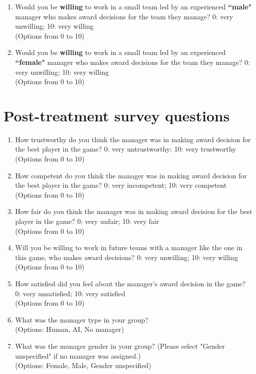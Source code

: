 \begin{enumerate}
    \item Would you be \textbf{willing} to work in a small team led by an experienced \textbf{``male"} manager who makes award decisions for the team they manage? 0: very unwilling; 10: very willing
   \\ (Options from 0 to 10)
    
    \item Would you be \textbf{willing} to work in a small team led by an experienced \textbf{``female"} manager who makes award decisions for the team they manage? 0: very unwilling; 10: very willing
   \\ (Options from 0 to 10)
   
\end{enumerate}

\section*{Post-treatment survey questions}

\begin{enumerate}

\item How trustworthy do you think the manager was in making award decision for the best player in the game? 0: very untrustworthy; 10: very trustworthy
\\ (Options from 0 to 10)

\item How competent do you think the manager was in making award decision for the best player in the game? 0: very incompetent; 10: very competent
\\ (Options from 0 to 10)

\item How fair do you think the manager was in making award decision for the best player in the game? 0: very unfair; 10: very fair
\\ (Options from 0 to 10)

\item Will you be willing to work in future teams with a manager like the one in this game, who makes award decisions? 0: very unwilling; 10: very willing
\\ (Options from 0 to 10)

\item How satisfied did you feel about the manager’s award decision in the game? 0: very unsatisfied; 10: very satisfied
\\ (Options from 0 to 10)

\item What was the manager type in your group?
\\ (Options: Human, AI, No manager)

\item What was the manager gender in your group? (Please select "Gender unspecified" if no manager was assigned.)
\\ (Options: Female, Male, Gender unspecified)
\end{enumerate}


